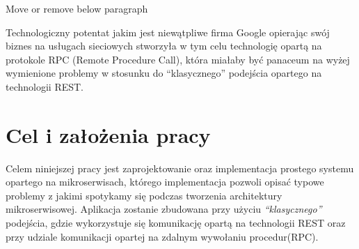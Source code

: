 \centerline{Move or remove below paragraph}
\par Technologiczny potentat jakim jest niewątpliwe firma Google opierając swój biznes na usługach sieciowych stworzyła w tym celu technologię opartą na protokole RPC (Remote Procedure Call), która miałaby być panaceum na wyżej wymienione problemy w stosunku do \enquote{klasycznego} podejścia opartego na technologii REST\@.
\section{Cel i założenia pracy}
Celem niniejszej pracy jest zaprojektowanie oraz implementacja prostego systemu opartego na mikroserwisach, którego implementacja pozwoli opisać typowe problemy z jakimi spotykamy się podczas tworzenia architektury mikroserwisowej. Aplikacja zostanie zbudowana przy użyciu \textit{\enquote{klasycznego}} podejścia, gdzie wykorzystuje się komunikację opartą na technologii REST oraz przy udziale komunikacji opartej na zdalnym wywołaniu procedur(RPC). 
\par 